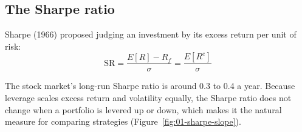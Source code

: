 \subsection{The Sharpe ratio}
\label{sec:01-sharpe}

Sharpe (1966) proposed judging an investment by its excess return per unit of risk:
\begin{equation}
  \mathrm{SR} = \frac{E[R] - R_f}{\sigma} = \frac{E[R^{e}]}{\sigma}
  \label{eq:01-sr}
\end{equation}

The stock market's long-run Sharpe ratio is around 0.3 to 0.4 a year. Because leverage scales excess return and volatility equally, the Sharpe ratio does not change when a portfolio is levered up or down, which makes it the natural measure for comparing strategies (Figure~\ref{fig:01-sharpe-slope}).



